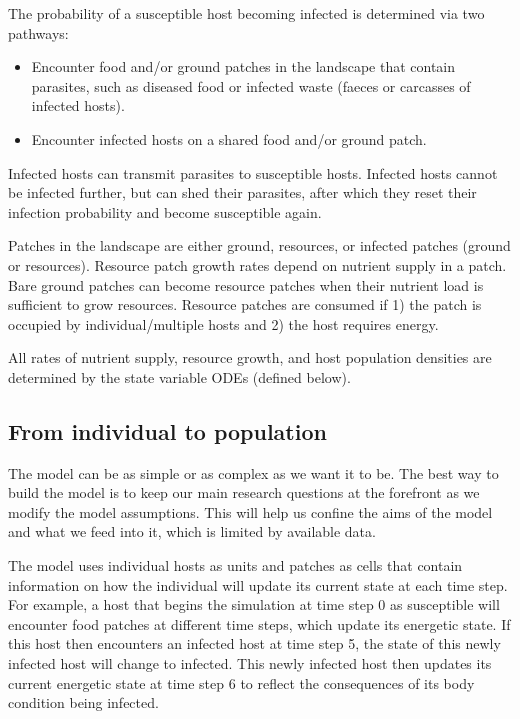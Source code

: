\documentclass[10,portrait]{article}
\begin{document}
The probability of a susceptible host becoming infected is determined
via two pathways:

\begin{itemize}
\item
  Encounter food and/or ground patches in the landscape that contain
  parasites, such as diseased food or infected waste (faeces or
  carcasses of infected hosts).
\item
  Encounter infected hosts on a shared food and/or ground patch.
\end{itemize}

Infected hosts can transmit parasites to susceptible hosts. Infected
hosts cannot be infected further, but can shed their parasites, after
which they reset their infection probability and become susceptible
again.

Patches in the landscape are either ground, resources, or infected
patches (ground or resources). Resource patch growth rates depend on
nutrient supply in a patch. Bare ground patches can become resource
patches when their nutrient load is sufficient to grow resources.
Resource patches are consumed if 1) the patch is occupied by
individual/multiple hosts and 2) the host requires energy.

All rates of nutrient supply, resource growth, and host population
densities are determined by the state variable ODEs (defined below).

\subsection{From individual to
population}\label{from-individual-to-population}

The model can be as simple or as complex as we want it to be. The best
way to build the model is to keep our main research questions at the
forefront as we modify the model assumptions. This will help us confine
the aims of the model and what we feed into it, which is limited by
available data.

The model uses individual hosts as units and patches as cells that
contain information on how the individual will update its current state
at each time step. For example, a host that begins the simulation at
time step 0 as susceptible will encounter food patches at different time
steps, which update its energetic state. If this host then encounters an
infected host at time step 5, the state of this newly infected host will
change to infected. This newly infected host then updates its current
energetic state at time step 6 to reflect the consequences of its body
condition being infected.
\end{document}
